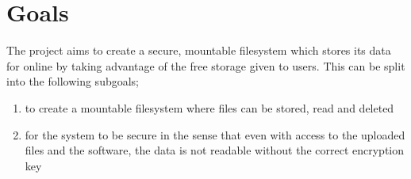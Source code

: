 
\section{Goals}


The project aims to create a secure, mountable filesystem which stores its data for online by taking advantage of the free storage given to users. This can be split into the following subgoals;
\begin{enumerate}
\item to create a mountable filesystem where files can be stored, read and deleted %
\item for the system to be secure in the sense that even with access to the uploaded files and the software, the data is not readable without the correct encryption key %
\end{enumerate}

